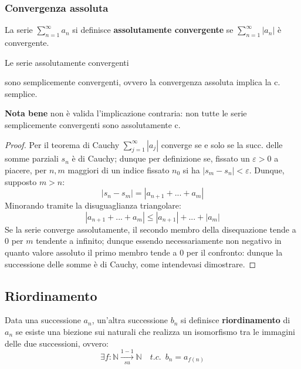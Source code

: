 \documentclass[10pt]{article}
\theoremstyle{plain}
\begin{document}
\subsubsection{Convergenza assoluta}
\begin{defin}
La serie $\sum_{n=1}^{\infty} a_n$ si definisce \textbf{assolutamente convergente} se $\sum_{n=1}^{\infty} |a_n|$ è convergente.
\end{defin}
\begin{ther}
\hypertarget{assolutamente}{Le serie assolutamente convergenti} sono semplicemente convergenti, ovvero la convergenza assoluta implica la c. semplice.
\end{ther}
\textbf{Nota bene} non è valida l'implicazione contraria: non tutte le serie semplicemente convergenti sono assolutamente c.
\begin{proof}
Per il teorema di Cauchy $\sum_{j=1}^{\infty} |a_j|$ converge se e solo se la succ. delle somme parziali $s_n$ è di Cauchy; dunque per definizione se, fissato un $\varepsilon > 0$ a piacere, per $n, m$ maggiori di un indice fissato $n_0$ si ha $|s_m - s_n| < \varepsilon$. Dunque, supposto $m > n$:
\[|s_n - s_m| = |a_{n+1} + ... + a_m|\]
Minorando tramite la disuguaglianza triangolare: 
\[|a_{n+1} + ... + a_m| \leq |a_{n+1}| + ... + |a_m|\]
Se la serie converge assolutamente, il secondo membro della disequazione tende a 0 per $m$ tendente a infinito; dunque essendo necessariamente non negativo in quanto valore assoluto il primo membro tende a 0 per il confronto: dunque la successione delle somme è di Cauchy, come intendevasi dimostrare.
\end{proof}

\subsection{Riordinamento}
\begin{defin}
    Data una successione $a_n$, un'altra successione $b_n$ si definisce \textbf{riordinamento} di $a_n$ se esiste una biezione sui naturali che realizza un isomorfismo tra le immagini delle due successioni, ovvero:
    \[\exists f : \mathbb{N} \xrightarrow[su]{1-1} \mathbb{N} \quad t.c. \enspace b_n = a_{f(n)}\]
\end{defin}
\end{document}
